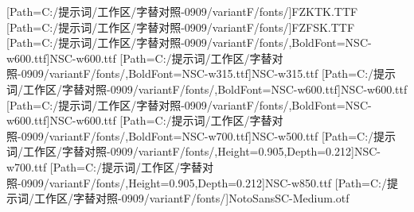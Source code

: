 \setmainfont{Times New Roman}
[Path=C:/提示词/工作区/字替对照-0909/variantF/fonts/]{FZKTK.TTF}
[Path=C:/提示词/工作区/字替对照-0909/variantF/fonts/]{FZFSK.TTF}
[Path=C:/提示词/工作区/字替对照-0909/variantF/fonts/,BoldFont=NSC-w600.ttf]{NSC-w600.ttf}
[Path=C:/提示词/工作区/字替对照-0909/variantF/fonts/,BoldFont=NSC-w315.ttf]{NSC-w315.ttf}
[Path=C:/提示词/工作区/字替对照-0909/variantF/fonts/,BoldFont=NSC-w600.ttf]{NSC-w600.ttf}
[Path=C:/提示词/工作区/字替对照-0909/variantF/fonts/,BoldFont=NSC-w600.ttf]{NSC-w600.ttf}
[Path=C:/提示词/工作区/字替对照-0909/variantF/fonts/,BoldFont=NSC-w700.ttf]{NSC-w500.ttf}
\newfontfamily{\numboldjian}[Path=C:/提示词/工作区/字替对照-0909/variantF/fonts/,Height=0.905,Depth=0.212]{NSC-w700.ttf}
\newfontfamily{\numbold}[Path=C:/提示词/工作区/字替对照-0909/variantF/fonts/,Height=0.905,Depth=0.212]{NSC-w850.ttf}
\newfontfamily{\numpnum}[Path=C:/提示词/工作区/字替对照-0909/variantF/fonts/]{NotoSansSC-Medium.otf}
\newcommand{\heiti}{\CJKfamily{heibf}}
\newcommand{\heizhang}{\CJKfamily{heizhang}}
\newcommand{\hejie}{\CJKfamily{hejie}}
\newcommand{\hekeshi}{\CJKfamily{hekeshi}}
\newcommand{\heibf}{\CJKfamily{heibf}}
\newcommand{\heihao}{\CJKfamily{heihao}}
\newcommand{\kaishu}{\CJKfamily{kai}}
\newcommand{\fangsong}{\CJKfamily{fangsong}}
